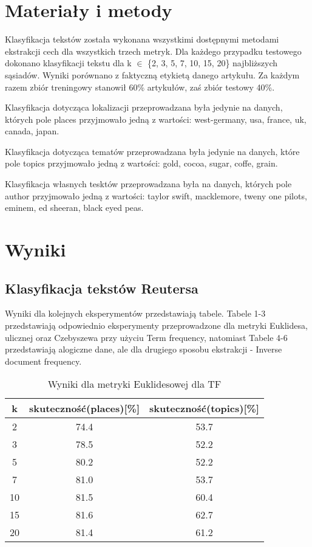 \documentclass{classrep}
\begin{document}
\section{Materiały i metody}

Klasyfikacja tekstów została wykonana wszystkimi dostępnymi metodami ekstrakcji cech dla wszystkich trzech metryk. Dla każdego przypadku testowego dokonano klasyfikacji tekstu dla k $\in$ \{2, 3, 5, 7, 10, 15, 20\} najbliższych sąsiadów. Wyniki porównano z faktyczną etykietą danego artykułu. Za każdym razem zbiór treningowy stanowił 60\% artykułów, zaś zbiór testowy 40\%. \newline

Klasyfikacja dotycząca lokalizacji przeprowadzana była jedynie na danych, których pole places przyjmowało jedną z wartości: west-germany, usa, france, uk, canada, japan. \newline

Klasyfikacja dotycząca tematów przeprowadzana była jedynie na danych, które pole topics przyjmowało jedną z wartości: gold, cocoa, sugar, coffe, grain. \newline

Klasyfikacja własnych tesktów przeprowadzana była na danych, których pole author przyjmowało jedną z wartości: taylor swift, macklemore, tweny one pilots, eminem, ed sheeran, black eyed peas.

\section{Wyniki}

\subsection{Klasyfikacja tekstów Reutersa}

Wyniki dla kolejnych eksperymentów przedstawiają tabele. Tabele 1-3 przedstawiają odpowiednio eksperymenty przeprowadzone dla metryki Euklidesa, ulicznej oraz Czebyszewa przy użyciu Term frequency, natomiast Tabele 4-6 przedstawiają alogiczne dane, ale dla drugiego sposobu ekstrakcji - Inverse document frequency.

\begin{table}[H]
	\centering
	\begin{tabular}{c c c} 
		\hline
		\textbf{k} & \textbf{skuteczność(places)[\%]} & \textbf{skuteczność(topics)[\%]} \\ [0.5ex] 
		\hline
		\hline 
		2 & 74.4 & 53.7 \\ 
		3 & 78.5 & 52.2 \\
		5 & 80.2 & 52.2 \\
		7 & 81.0 & 53.7 \\
		10 & 81.5 & 60.4 \\
		15 & 81.6 & 62.7 \\
		20 & 81.4 & 61.2 \\ 
		\hline
	\end{tabular}
	\caption{Wyniki dla metryki Euklidesowej dla TF}
\end{table}
\end{document}
